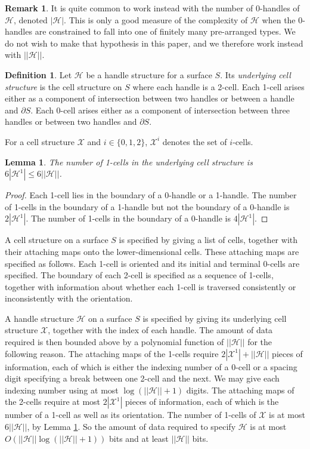 \documentclass[oneside]{amsart}
\numberwithin{equation}{section}
\theoremstyle{plain}
\newtheorem{lemma}[equation]{Lemma}
\theoremstyle{definition}
\newtheorem{definition}[equation]{Definition}
\newtheorem{remark}[equation]{Remark}
\newcommand{\calH}{\mathcal{H}}
\newcommand{\calX}{\mathcal{X}}
\begin{document}
\begin{remark}
It is quite common to work instead with the number of 0-handles of $\calH$, denoted $|\calH|$. This is only a good measure of the complexity of $\calH$ when the 0-handles are constrained to fall into one of finitely many pre-arranged types. We do not wish to make that hypothesis in this paper, and we therefore work instead with $||\calH||$.
\end{remark}

\begin{definition}
Let $\calH$ be a handle structure for a surface $S$. Its \emph{underlying cell structure} is the cell structure on $S$ where each handle is a 2-cell. Each 1-cell arises either as a component of intersection between two handles or between a handle and $\partial S$. Each 0-cell arises either as a component of intersection between three handles or between two handles and $\partial S$.
\end{definition}

For a cell structure $\calX$ and $i \in \{ 0,1,2 \}$, $\calX^i$ denotes the set of $i$-cells.

\begin{lemma} 
\label{Lem:Number1Cells}
The number of 1-cells in the underlying cell structure is $6|\calH^1| \leq 6||\calH||$.
\end{lemma}

\begin{proof}
Each 1-cell lies in the boundary of a 0-handle or a 1-handle. The number of 1-cells in the boundary of a 1-handle but not the boundary of a 0-handle is $2|\calH^1|$. The number of 1-cells in the boundary of a 0-handle is $4|\calH^1|$.
\end{proof}


A cell structure on a surface $S$ is specified by giving a list of cells, together with their attaching maps onto the lower-dimensional cells. These attaching maps are specified as follows. Each 1-cell is oriented and its initial and terminal 0-cells are specified. The boundary of each 2-cell is specified as a sequence of 1-cells, together with information about whether each 1-cell is traversed consistently or inconsistently with the orientation. 

A handle structure $\calH$ on a surface $S$ is specified by giving its underlying cell structure $\calX$, together with the index of each handle. The amount of data required is then bounded above by a polynomial function of $||\calH||$ for the following reason. The attaching maps of the 1-cells require $2|\calX^1| + ||\calH||$ pieces of information, each of which is either the indexing number of a 0-cell or a spacing digit specifying a break between one 2-cell and the next. We may give each indexing number using at most $\log (||\calH|| + 1)$ digits. The attaching maps of the 2-cells require at most $2|\calX^1|$ pieces of information, each of which is the number of a 1-cell as well as its orientation. The number of 1-cells of $\calX$ is at most $6||\calH||$, by Lemma \ref{Lem:Number1Cells}. So the amount of data required to specify $\calH$ is at most $O(||\calH|| \log (||\calH||+1))$ bits and at least $||\calH||$ bits.
\end{document}
